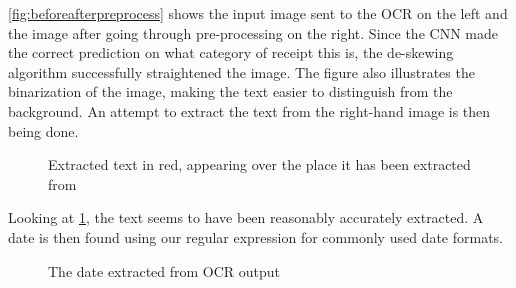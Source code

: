 \ref{fig:beforeafterpreprocess} shows the input image sent to the OCR on the left and the image after going through pre-processing on the right.
Since the CNN made the correct prediction on what category of receipt this is, the de-skewing algorithm successfully straightened the image.
The figure also illustrates the binarization of the image, making the text easier to distinguish from the background.
An attempt to extract the text from the right-hand image is then being done.

\begin{figure}[h]
    \caption{Extracted text in red, appearing over the place it has been extracted from}
    \label{fig:ocrtextboxes}
\end{figure}

Looking at \ref{fig:ocrtextboxes}, the text seems to have been reasonably accurately extracted.
A date is then found using our regular expression for commonly used date formats.

\begin{figure}[h]
    \caption{The date extracted from OCR output}
    \label{fig:dateocr}
\end{figure}


